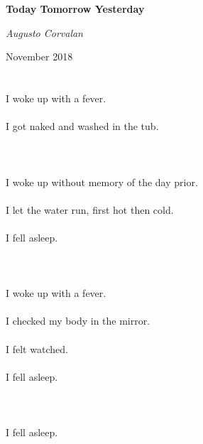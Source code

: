 \documentclass{article}
\begin{document}
    \begin{titlepage}
    \centering
    \begin{center}
    {\huge\bfseries Today Tomorrow Yesterday \par}
    \end{center}
    \vspace{2cm}
    {\Large\itshape Augusto Corvalan\par}
    \vfill
    {\large November 2018\par}
    \end{titlepage}

    
    \section{}
    I woke up with a fever.\\\\I got naked and washed in the tub.\\\\ 
    \newpage
    
    \section{}
    I woke up without memory of the day prior.\\\\I let the water run, first hot then cold.\\\\I fell asleep.\\\\ 
    \newpage
    
    \section{}
    I woke up with a fever.\\\\I checked my body in the mirror.\\\\I felt watched.\\\\I fell asleep.\\\\ 
    \newpage
    
    \section{}
    I fell asleep.\\\\ 
    \newpage
    
\end{document}
